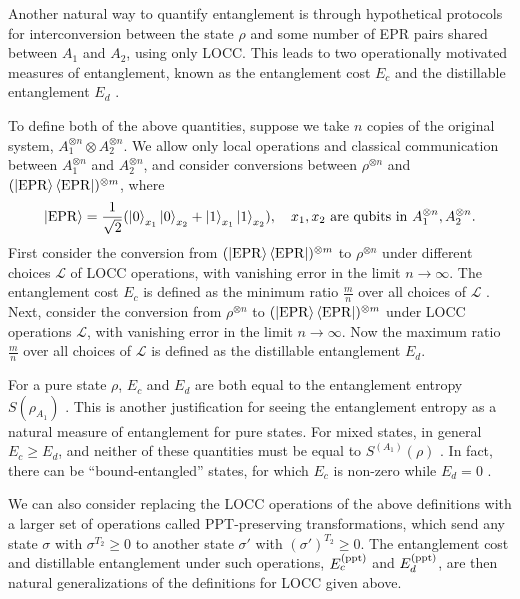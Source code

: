 \documentclass[a4paper,11pt]{article}
\newcommand{\be}{\begin{equation}}
\newcommand{\ee}{\end{equation}}
\newcommand\sL{{\ensuremath{{\mathcal L}}}}
\begin{document}
Another natural way to quantify entanglement is through hypothetical protocols for interconversion between the state $\rho$ and some number of EPR pairs shared between $A_1$ and $A_2$, using only LOCC. This leads to two operationally motivated measures of entanglement, known as the entanglement cost $E_c$ and the distillable entanglement $E_d$ \cite{bennett1996mixed}. 

To define both of the above quantities, suppose we take $n$ copies of the original system, $A_1^{\otimes n} \otimes A_2^{\otimes n}$. We allow only local operations and classical communication between $A_1^{\otimes n}$ and $A_2^{\otimes n}$, and consider conversions between $\rho^{\otimes n}$ and $(\ket{\rm EPR}\bra{\rm EPR})^{\otimes m}$, 
where 
\be 
\ket{\rm EPR} = \frac{1}{\sqrt{2}}(\ket{0}_{x_1}\ket{0}_{x_2}+ \ket{1}_{x_1}\ket{1}_{x_2}), \quad x_1, x_2 \text{ are qubits in $A_1^{\otimes n}, A_2^{\otimes n}$.} 
\ee
First consider the conversion from $(\ket{\rm EPR}\bra{\rm EPR})^{\otimes m}$ to $\rho^{\otimes n}$ under different choices $\sL$ of LOCC operations, with vanishing error in the limit $n\rightarrow \infty$. The entanglement cost $E_c$ is defined as the minimum ratio $\frac{m}{n}$ over all choices of $\sL$ \cite{hayden2001asymptotic}. Next, consider the conversion from $\rho^{\otimes n}$ to $(\ket{\rm EPR}\bra{\rm EPR})^{\otimes m}$ under LOCC operations $\sL$, with vanishing error in the limit $n\rightarrow \infty$. Now the maximum ratio $\frac{m}{n}$ over all choices of $\sL$ is defined as the distillable entanglement $E_d$. 

For a pure state $\rho$, 
$E_c$ and $E_d$ are both equal to the entanglement entropy $S(\rho_{A_1})$ \cite{1996PhRvA..53.2046B}. This is another justification for seeing the entanglement entropy as a natural measure of entanglement for pure states. 
For mixed states, in general 
$E_c \geq E_d$, 
and neither of these quantities must be equal to $S^{(A_1)}(\rho)$ \cite{bennett1996mixed}. In fact, there can be ``bound-entangled'' states, for which $E_c$ is non-zero while $E_d=0$ \cite{horodecki1998mixed}. 

We can also consider replacing the LOCC operations of the above definitions with a larger set of operations called PPT-preserving transformations, which send any state $\sigma$ with $\sigma^{T_2}\geq 0$ to another state $\sigma'$ with $(\sigma')^{T_2}\geq 0$. The entanglement cost and distillable entanglement under such operations, $E_c^{(\rm ppt)}$ and $E_d^{(\rm ppt)}$, are then natural generalizations of the definitions for LOCC given above. 
\end{document}
